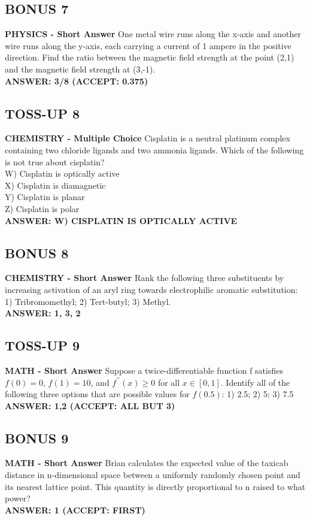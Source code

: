 \documentclass{article}
\begin{document}
\subsection*{BONUS 7}
\textbf{PHYSICS - Short Answer} One metal wire runs along the x-axis and another wire runs along the y-axis, each carrying a current of 1 ampere in the positive direction. Find the ratio between the magnetic field strength at the point (2,1) and the magnetic field strength at (3,-1). \\
\textbf{ANSWER: 3/8 (ACCEPT: 0.375)}

\subsection*{TOSS-UP 8}
\textbf{CHEMISTRY - Multiple Choice} Cisplatin is a neutral platinum complex containing two chloride ligands and two ammonia ligands. Which of the following is not true about cisplatin? \\
W) Cisplatin is optically active \\
X) Cisplatin is diamagnetic \\
Y) Cisplatin is planar \\
Z) Cisplatin is polar \\
\textbf{ANSWER: W) CISPLATIN IS OPTICALLY ACTIVE}

\subsection*{BONUS 8}
\textbf{CHEMISTRY - Short Answer} Rank the following three substituents by increasing activation of an aryl ring towards electrophilic aromatic substitution: 1) Tribromomethyl; 2) Tert-butyl; 3) Methyl. \\
\textbf{ANSWER: 1, 3, 2}

\subsection*{TOSS-UP 9}
\textbf{MATH - Short Answer} Suppose a twice-differentiable function f satisfies $f(0)=0$, $f(1)=10$, and $f^{\prime\prime}(x)\ge0$ for all $x\in[0,1]$. Identify all of the following three options that are possible values for $f(0.5)$: 1) 2.5; 2) 5; 3) 7.5 \\
\textbf{ANSWER: 1,2 (ACCEPT: ALL BUT 3)}

\subsection*{BONUS 9}
\textbf{MATH - Short Answer} Brian calculates the expected value of the taxicab distance in n-dimensional space between a uniformly randomly chosen point and its nearest lattice point. This quantity is directly proportional to n raised to what power? \\
\textbf{ANSWER: 1 (ACCEPT: FIRST)}
\end{document}
